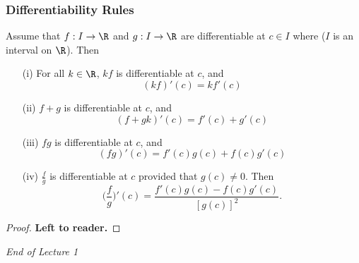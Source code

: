 \subsubsection{Differentiability Rules}\label{Differentiability Rules}

\begin{theorem}
    Assume that \( f: I \to \R  \) and \( g : I \to \R  \) are differentiable at \( c \in I  \) where (\( I  \) is an interval on \( \R  \)). Then
    \begin{enumerate}
        \item[(i)] For all \( k \in \R  \), \( kf  \) is differentiable at \( c  \), and
            \[  (kf)'(c) = k f'(c) \]
        \item[(ii)] \( f+ g  \) is differentiable at \( c  \), and 
            \[  (f+gk)'(c) = f'(c) + g'(c) \]
        \item[(iii)] \( fg  \) is differentiable at \( c  \), and 
            \[  (fg)'(c) = f'(c) g(c) + f(c) g'(c) \]
        \item[(iv)] \( \frac{ f }{ g }  \) is differentiable at \( c  \) provided that \( g(c) \neq 0  \). Then
            \[  \Big(  \frac{ f }{ g }  \Big)' (c) = \frac{ f'(c) g(c) - f(c) g'(c) }{ [g(c)]^{2} }. \]
    \end{enumerate} 
\end{theorem}

\begin{proof}
\textbf{Left to reader.}
\end{proof}

\begin{center}
    \textit{End of Lecture 1} 
\end{center}


